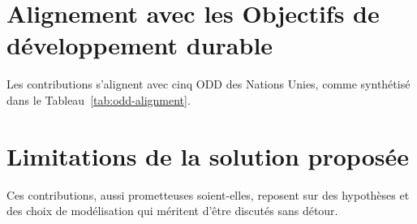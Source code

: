 \section{Alignement avec les Objectifs de développement durable}\label{sec:concl-odd}

Les contributions s'alignent avec cinq ODD des Nations Unies, comme synthétisé dans le Tableau~\ref{tab:odd-alignment}.

\begin{table}[htbp]
\centering
\caption{Alignement des contributions avec les ODD des Nations Unies.}
\label{tab:odd-alignment}
\end{table}


\section{Limitations de la solution proposée}\label{sec:concl-limitations}

Ces contributions, aussi prometteuses soient-elles, reposent sur des hypothèses et des choix de modélisation qui méritent d'être discutés sans détour.

